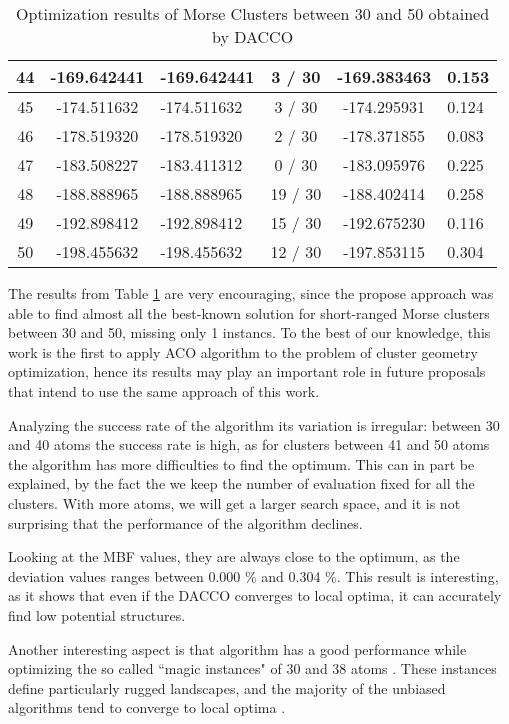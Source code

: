 \begin{table}[!htbp]
\begin{center}
\begin{tabular}{| c | c | p{3cm} | c | c | p{2cm} |}
				44 & -169.642441 & -169.642441 & 3 / 30 & -169.383463 & 0.153 \\ \hline
				45 & -174.511632 & -174.511632 & 3 / 30 & -174.295931 & 0.124 \\ \hline
				46 & -178.519320 & -178.519320 & 2 / 30 & -178.371855 & 0.083 \\ \hline
				47 & -183.508227 & -183.411312 & 0 / 30 & -183.095976 & 0.225 \\ \hline
				48 & -188.888965 & -188.888965 & 19 / 30 & -188.402414 & 0.258 \\ \hline
				49 & -192.898412 & -192.898412 & 15 / 30 & -192.675230 & 0.116 \\ \hline
				50 & -198.455632 & -198.455632 & 12 / 30 & -197.853115 & 0.304 \\ \hline
			\end{tabular}
		\caption{Optimization results of Morse Clusters between 30 and 50 obtained by DACCO}
		\label{tab:optimization_results}
		\end{center}
	\end{table}
	
	The results from Table \ref{tab:optimization_results} are very encouraging, since the propose approach was able to find almost all the best-known solution for short-ranged Morse clusters between 30 and 50, missing only 1 instancs.
	To the best of our knowledge, this work is the first to apply ACO algorithm to the problem of cluster geometry optimization, hence its results may play an important role in future proposals that intend to use the same approach of this work.
	
	Analyzing the success rate of the algorithm its variation is irregular: between 30 and 40 atoms the success rate is high, as for clusters between 41 and 50 atoms the algorithm has more difficulties to find the optimum. This can in part be explained, by the fact the we keep the number of evaluation fixed for all the clusters. With more atoms, we will get a larger search space, and it is not surprising that the performance of the algorithm declines.
	
	Looking at the MBF values, they are always close to the optimum, as the deviation values ranges between 0.000 \% and 0.304 \%. This result is interesting, as it shows that even if the DACCO converges to local optima, it can accurately find low potential structures.
	
	Another interesting aspect is that algorithm has a good performance while optimizing the so called ``magic instances" of 30 and 38 atoms \cite{doye97}. These instances define particularly rugged landscapes, and the majority of the unbiased algorithms tend to converge to local optima \cite{doye97, grosso07}.
	
